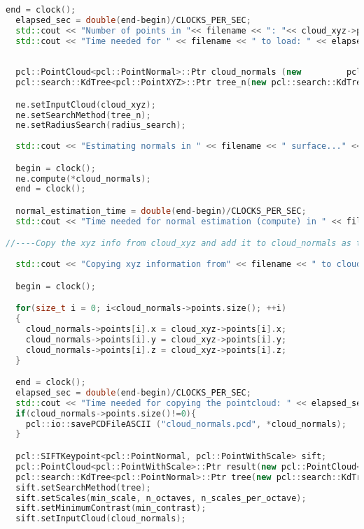 \begin{lstlisting}[language=C++,breaklines]
  end = clock();
  elapsed_sec = double(end-begin)/CLOCKS_PER_SEC;
  std::cout << "Number of points in "<< filename << ": "<< cloud_xyz->points.size () <<std::endl; 
  std::cout << "Time needed for " << filename << " to load: " << elapsed_sec << " seconds"<< std::endl << std::endl; 
 
  
  pcl::PointCloud<pcl::PointNormal>::Ptr cloud_normals (new 		pcl::PointCloud<pcl::PointNormal>);
  pcl::search::KdTree<pcl::PointXYZ>::Ptr tree_n(new pcl::search::KdTree<pcl::PointXYZ>());

  ne.setInputCloud(cloud_xyz);
  ne.setSearchMethod(tree_n);
  ne.setRadiusSearch(radius_search);
 
  std::cout << "Estimating normals in " << filename << " surface..." <<std::endl;

  begin = clock();
  ne.compute(*cloud_normals);
  end = clock();

  normal_estimation_time = double(end-begin)/CLOCKS_PER_SEC;
  std::cout << "Time needed for normal estimation (compute) in " << filename << ": " << normal_estimation_time << " seconds" << std::endl << std::endl;

//----Copy the xyz info from cloud_xyz and add it to cloud_normals as the xyz field in PointNormals estimation is zero---
  
  std::cout << "Copying xyz information from" << filename << " to cloud with normals information..." << std::endl;

  begin = clock();

  for(size_t i = 0; i<cloud_normals->points.size(); ++i)
  {
  	cloud_normals->points[i].x = cloud_xyz->points[i].x;
  	cloud_normals->points[i].y = cloud_xyz->points[i].y;
  	cloud_normals->points[i].z = cloud_xyz->points[i].z;
  }

  end = clock();
  elapsed_sec = double(end-begin)/CLOCKS_PER_SEC;
  std::cout << "Time needed for copying the pointcloud: " << elapsed_sec <<" seconds" << std::endl << std::endl;
  if(cloud_normals->points.size()!=0){
  	pcl::io::savePCDFileASCII ("cloud_normals.pcd", *cloud_normals);
  }

  pcl::SIFTKeypoint<pcl::PointNormal, pcl::PointWithScale> sift;
  pcl::PointCloud<pcl::PointWithScale>::Ptr result(new pcl::PointCloud<pcl::PointWithScale>);
  pcl::search::KdTree<pcl::PointNormal>::Ptr tree(new pcl::search::KdTree<pcl::PointNormal> ());
  sift.setSearchMethod(tree);
  sift.setScales(min_scale, n_octaves, n_scales_per_octave);
  sift.setMinimumContrast(min_contrast);
  sift.setInputCloud(cloud_normals);
 

\end{lstlisting}
